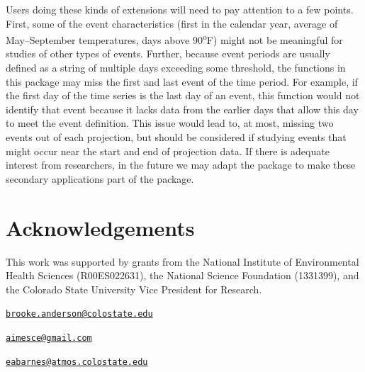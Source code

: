 Users doing these kinds of extensions will need to pay attention to a
few points. First, some of the event characteristics (first in the
calendar year, average of May--September temperatures, days above
90\textsuperscript{o}F) might not be meaningful for studies of other
types of events. Further, because event periods are usually defined as a
string of multiple days exceeding some threshold, the functions in this
package may miss the first and last event of the time period. For
example, if the first day of the time series is the last day of an
event, this function would not identify that event because it lacks data
from the earlier days that allow this day to meet the event definition.
This issue would lead to, at most, missing two events out of each
projection, but should be considered if studying events that might occur
near the start and end of projection data. If there is adequate interest
from researchers, in the future we may adapt the package to make these
secondary applications part of the package.

\section{Acknowledgements}\label{acknowledgements}

This work was supported by grants from the National Institute of
Environmental Health Sciences (R00ES022631), the National Science
Foundation (1331399), and the Colorado State University Vice President
for Research.



\address{%
G. Brooke Anderson\\
Colorado State University\\
Department of Environmental \& Radiological Health Sciences\\ 1681 Campus Delivery\\ Fort Collins, Colorado 80523\\
}
\href{mailto:brooke.anderson@colostate.edu}{\nolinkurl{brooke.anderson@colostate.edu}}

\address{%
Colin Eason\\
Colorado State University\\
Department of Computer Science\\ 1873 Campus Delivery\\ Fort Collins, Colorado 80523\\
}
\href{mailto:aimesce@gmail.com}{\nolinkurl{aimesce@gmail.com}}

\address{%
Elizabeth A. Barnes\\
Colorado State University\\
Department of Atmospheric Science\\ 1371 Campus Delivery\\ Fort Collins, CO 80523\\
}
\href{mailto:eabarnes@atmos.colostate.edu}{\nolinkurl{eabarnes@atmos.colostate.edu}}

